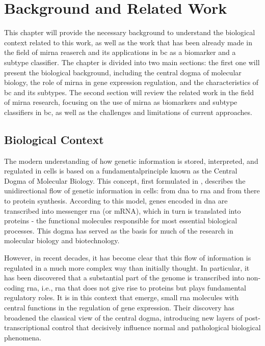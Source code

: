 
%

\chapter{Background and Related Work}

This chapter will provide the necessary background to understand the biological
context related to this work, as well as the work that has been already made in
the field of \gls{mirna} reaserch and its applications in \gls{bc} as a
biomarker and a subtype classifier. The chapter is divided into two main
sections: the first one will present the biological background, including the
central dogma of molecular biology, the role of \gls{mirna} in gene expression
regulation, and the characteristics of \gls{bc} and its subtypes. The second
section will review the related work in the field of \gls{mirna} research,
focusing on the use of \gls{mirna} as biomarkers and subtype classifiers in
\gls{bc}, as well as the challenges and limitations of current approaches.

\section{Biological Context}
The modern understanding of how genetic information is stored, interpreted, and
regulated in cells is based on a fundamentalprinciple known as the Central
Dogma of Molecular Biology. This concept, first formulated in
\textcites{discovery_dna_Watson1953The, updated_disc_of_dna_Pray2008DNA},
describes the unidirectional flow of genetic information in cells: from
\gls{dna} to \gls{rna} and from there to protein synthesis. According to this
model, genes encoded in \gls{dna} are transcribed into messenger \gls{rna} (or
mRNA), which in turn is translated into proteins - the functional molecules
responsible for most essential biological processes. This dogma has served as
the basis for much of the research in molecular biology and biotechnology.

However, in recent decades, it has become clear that this flow of information
is regulated in a much more complex way than initially thought. In particular,
it has been discovered that a substantial part of the genome is transcribed
into non-coding \gls{rna}, i.e., \gls{rna} that does not give rise to proteins
but plays fundamental regulatory roles. It is in this context that
 emerge, small \gls{rna} molecules with central functions in
the regulation of gene expression. Their discovery has broadened the classical
view of the central dogma, introducing new layers of post-transcriptional
control that decisively influence normal and pathological biological phenomena.

